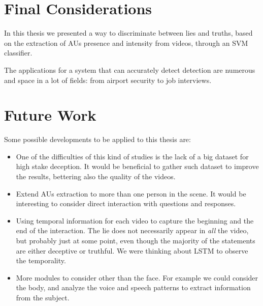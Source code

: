 

\section{Final Considerations}
In this thesis we presented a way to discriminate between lies and truths, based on the extraction of AUs presence and intensity from videos, through an SVM classifier.

The applications for a system that can accurately detect detection are numerous and space in a lot of fields: from airport security to job interviews.





\section{Future Work}
Some possible developments to be applied to this thesis are:
\begin{itemize}
	\item One of the difficulties of this kind of studies is the lack of a big dataset for high stake deception. It would be beneficial to gather such dataset to improve the results, bettering also the quality of the videos.
	\item Extend AUs extraction to more than one person in the scene. It would be interesting to consider direct interaction with questions and responses. 
	\item Using temporal information for each video to capture the beginning and the end of the interaction. The lie does not necessarily appear in \textit{all} the video, but probably just at some point, even though the majority of the statements are either deceptive or truthful. We were thinking about LSTM to observe the temporality.
	\item More modules to consider other than the face. For example we could consider the body, and analyze the voice and speech patterns to extract information from the subject.
\end{itemize}
